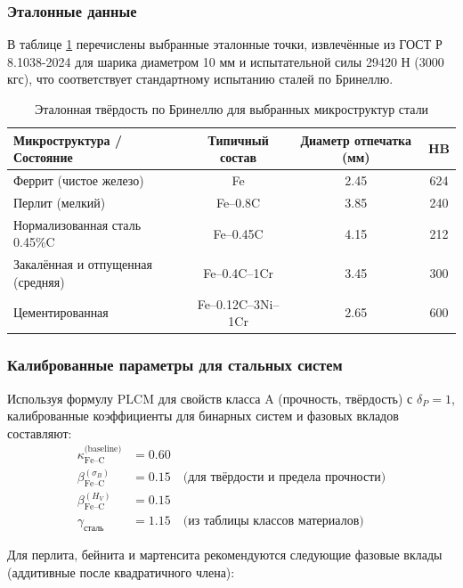\documentclass[12pt,a4paper]{article}
\begin{document}
	\subsubsection{Эталонные данные}
	В таблице \ref{tab:steel_reference} перечислены выбранные эталонные точки, извлечённые из ГОСТ Р 8.1038-2024 для шарика диаметром 10 мм и испытательной силы 29420 Н (3000 кгс), что соответствует стандартному испытанию сталей по Бринеллю.
	
	\begin{table}[htbp]
		\centering
		\caption{Эталонная твёрдость по Бринеллю для выбранных микроструктур стали}
		\label{tab:steel_reference}
		\begin{tabular}{lccc}
			\toprule
			\textbf{Микроструктура / Состояние} & \textbf{Типичный состав} & \textbf{Диаметр отпечатка (мм)} & \textbf{HB} \\
			\midrule
			Феррит (чистое железо) & Fe & 2.45 & 624 \\
			Перлит (мелкий) & Fe–0.8C & 3.85 & 240 \\
			Нормализованная сталь 0.45\%C & Fe–0.45C & 4.15 & 212 \\
			Закалённая и отпущенная (средняя) & Fe–0.4C–1Cr & 3.45 & 300 \\
			Цементированная & Fe–0.12C–3Ni–1Cr & 2.65 & 600 \\
			\bottomrule
		\end{tabular}
	\end{table}
	
	\subsubsection{Калиброванные параметры для стальных систем}
	Используя формулу PLCM для свойств класса A (прочность, твёрдость) с $\delta_P = 1$, калиброванные коэффициенты для бинарных систем и фазовых вкладов составляют:
	\begin{align*}
		\kappa_{\text{Fe–C}}^{\text{(baseline)}} &= 0.60 \\
		\beta_{\text{Fe–C}}^{(\sigma_B)} &= 0.15 \quad \text{(для твёрдости и предела прочности)} \\
		\beta_{\text{Fe–C}}^{(H_V)} &= 0.15 \\
		\gamma_{\text{сталь}} &= 1.15 \quad \text{(из таблицы классов материалов)}
	\end{align*}
	
	Для перлита, бейнита и мартенсита рекомендуются следующие фазовые вклады (аддитивные после квадратичного члена):
	
\end{document}
